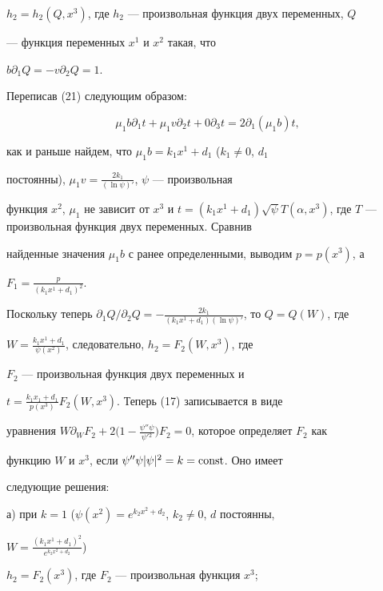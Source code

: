 $h_2=h_2(Q,x^3)$, где $h_2$ --- произвольная функция двух переменных, $Q$ 


--- функция переменных $x^1$ и $x^2$ такая, что 


$b\partial_1Q=-v\partial_2Q=1$. 


 


Переписав (21) следующим образом: 


$$ 


\mu_1b\partial_1t+\mu_1v\partial_2t+0\partial_3t= 


2\partial_1(\mu_1b)t, 


$$ 


как и раньше найдем, что $\mu_1b=k_1x^1+d_1$ ($k_1\ne0$, $d_1$ 


постоянны), $\mu_1v=\frac{2k_1}{(\ln\psi)'}$, $\psi$ --- произвольная 


функция $x^2$, $\mu_1$ не зависит от $x^3$ и $t=(k_1x^1+d_1)\sqrt{\psi}


T(\alpha,x^3)$, где $T$ --- произвольная функция двух переменных. Сравнив 


найденные значения $\mu_1b$ с ранее определенными, выводим $p=p(x^3)$, а 


$F_1=\frac{p}{(k_1x^1+d_1)^2}$. 


 


Поскольку теперь $\partial_1Q/\partial_2Q= 


-\frac{2k_1}{(k_1x^1+d_1)(\ln\psi)'}$, то $Q=Q(W)$, где 


$W=\frac{k_1x^1+d_1}{\psi(x^2)}$, следовательно, $h_2=F_2(W,x^3)$, где 


$F_2$ --- произвольная функция двух переменных и 


$t=\frac{k_1x_1+d_1}{p(x^3)}F_2(W,x^3)$. Теперь (17) записывается в виде 


уравнения $W\partial_WF_2+2\big(1- 


\frac{\psi''\psi}{\psi'{}^2}\big)F_2=0$, которое определяет $F_2$ как 


функцию $W$ и $x^3$, если $\psi''\psi|\psi|^2=k=\operatorname{const}$. Оно имеет 


следующие решения: 


 


а) при $k=1$ ($\psi(x^2)=e^{k_2x^2+d_2}$, $k_2\ne0$, $d$ постоянны, 


$W=\frac{(k_1x^1+d_1)^2}{e^{k_2x^2+d_2}}$) 


$h_2=F_2(x^3)$, где $F_2$ --- произвольная функция $x^3$; 





